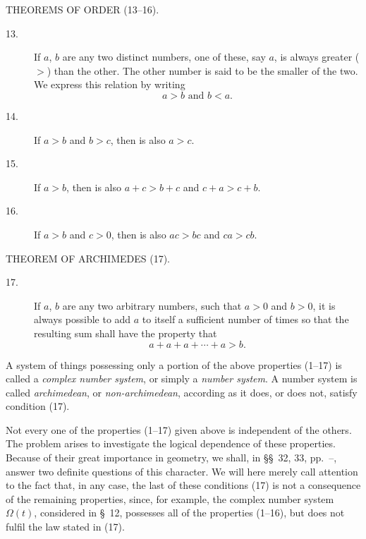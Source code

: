 \documentclass[11pt,oneside]{book}
\begin{document}
\begin{center}
THEOREMS OF ORDER (13--16).
\end{center}
\medskip

\begin{description}
\item[13.] If $a$, $b$ are any two distinct numbers, one of
these, say $a$, is always greater ($>$) than the
other. The other number is said to be the
smaller of the two. We express this relation
by writing
\[
a > b \mbox{ and } b < a.
\]
\item[14.] If $a > b$ and $b > c$, then is also $a > c$.
\item[15.] If $a > b$, then is also $a+c > b+ c$ and $c+a > c+b$.
\item[16.] If $a > b$ and $c>0$, then is also $ac>bc$ and
$ca > cb$.
\end{description}
\medskip

\begin{center}
THEOREM OF ARCHIMEDES (17).
\end{center}
\medskip

\begin{description}
\item[17.] If $a$, $b$ are any two arbitrary numbers, such
that $a > 0$ and $b > 0$, it is always possible to
add $a$ to itself a sufficient number of times so
that the resulting sum shall have the property
that
\[
a+a+a+ \cdots + a > b.
\]
\end{description}

A system of things possessing only a portion of the
above properties (1--17) is called a \emph{complex number
system}, or simply a \emph{number system}. A number system
is called \emph{archimedean}, or \emph{non-archimedean}, according as
it does, or does not, satisfy condition (17).

Not every one of the properties (1--17) given above
is independent of the others. The problem arises to
investigate the logical dependence of these properties.
Because of their great importance in geometry, we
shall, in \S\S~32, 33, pp.~\pageref{folio101}--\pageref{folio106}, answer two definite
questions of this character. We will here merely call
attention to the fact that, in any case, the last of these
conditions (17) is not a consequence of the remaining
properties, since, for example, the complex number
system $\Omega(t)$, considered in \S~12, possesses all of the
properties (1--16), but does not fulfil the law stated
in (17).
\end{document}
